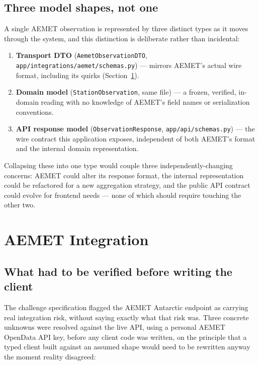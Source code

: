 \documentclass[11pt,a4paper]{article}
\begin{document}
\subsection{Three model shapes, not one}

A single AEMET observation is represented by three distinct types as it
moves through the system, and this distinction is deliberate rather than
incidental:

\begin{enumerate}[nosep]
    \item \textbf{Transport DTO} (\texttt{AemetObservationDTO},
    \texttt{app/integrations/aemet/schemas.py}) --- mirrors AEMET's actual
    wire format, including its quirks (Section~\ref{sec:aemet-integration}).
    \item \textbf{Domain model} (\texttt{StationObservation}, same file) ---
    a frozen, verified, in-domain reading with no knowledge of AEMET's
    field names or serialization conventions.
    \item \textbf{API response model} (\texttt{ObservationResponse},
    \texttt{app/api/schemas.py}) --- the wire contract this application
    exposes, independent of both AEMET's format and the internal domain
    representation.
\end{enumerate}

Collapsing these into one type would couple three independently-changing
concerns: AEMET could alter its response format, the internal
representation could be refactored for a new aggregation strategy, and the
public API contract could evolve for frontend needs --- none of which
should require touching the other two.

\section{AEMET Integration}
\label{sec:aemet-integration}

\subsection{What had to be verified before writing the client}

The challenge specification flagged the AEMET Antarctic endpoint as
carrying real integration risk, without saying exactly what that risk was.
Three concrete unknowns were resolved against the live API, using a
personal AEMET OpenData API key, before any client code was written, on the
principle that a typed client built against an assumed shape would need to
be rewritten anyway the moment reality disagreed:
\end{document}
